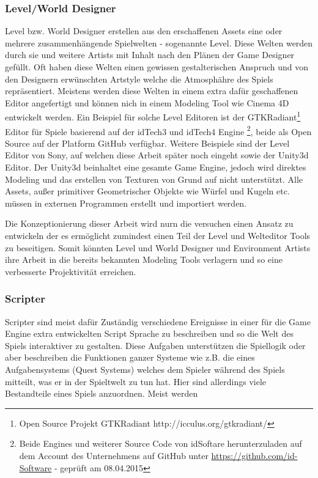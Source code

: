 \documentclass[pagesize, paper=a4, fontsize=12pt,titlepage=true, headings=small, headnosepline, abstractoff, liststotoc, nochapterprefix, plainheadsepline, twoside]{scrreprt}
\begin{document}
\subsubsection{Level/World Designer}
Level bzw. World Designer erstellen aus den erschaffenen Assets eine oder mehrere zusammenhängende Spielwelten - sogenannte Level. Diese Welten werden durch sie und weitere Artists mit Inhalt nach den Plänen der Game Designer gefüllt. Oft haben diese Welten einen gewissen gestalterischen Anspruch und von den Designern erwünschten Artstyle welche die Atmosphähre des Spiels repräsentiert. Meistens werden diese Welten in einem extra dafür geschaffenen Editor angefertigt und können nich in einem Modeling Tool wie Cinema 4D entwickelt werden. Ein Beispiel für solche Level Editoren ist der GTKRadiant\footnote{Open Source Projekt GTKRadiant http://icculus.org/gtkradiant/} Editor für Spiele basierend auf der idTech3 und idTech4  Engine \footnote{Beide Engines und weiterer Source Code von idSoftare herunterzuladen auf dem Account des Unternehmens auf GitHub unter \url{https://github.com/id-Software} - geprüft am 08.04.2015}, beide als Open Source auf der Platform GitHub verfügbar. Weitere Beispiele sind der Level Editor von Sony, auf welchen diese Arbeit später noch eingeht sowie der Unity3d Editor. Der Unity3d beinhaltet eine gesamte Game Engine, jedoch wird direktes Modeling und das erstellen von Texturen von Grund auf nicht unterstützt. Alle Assets, außer primitiver Geometrischer Objekte wie Würfel und Kugeln etc. müssen in externen Programmen erstellt und importiert werden.

Die Konzeptionierung dieser Arbeit wird nurn die versuchen einen Ansatz zu entwickeln der es ermöglicht zumindest einen Teil der Level und Welteditor Tools zu beseitigen. Somit könnten Level und World Designer und Environment Artists ihre Arbeit in die bereits bekannten Modeling Tools verlagern und so eine verbesserte Projektivität erreichen.

\subsubsection{Scripter}
Scripter sind meist dafür Zuständig verschiedene Ereignisse in einer für die Game Engine extra entwickelten Script Sprache zu beschreiben und so die Welt des Spiels interaktiver zu gestalten. Diese Aufgaben unterstützen die Spiellogik oder aber beschreiben die Funktionen ganzer Systeme wie z.B. die eines Aufgabensystems (Quest Systems) welches dem Spieler während des Spiels mitteilt, was er in der Spieltwelt zu tun hat. Hier sind allerdings viele Bestandteile eines Spiels anzuordnen. Meist werden 
\end{document}
